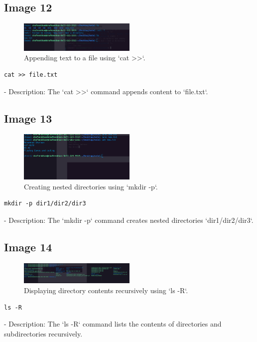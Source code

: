 \documentclass[12pt]{article}
\begin{document}
\subsection*{Image 12}
\begin{figure}[h!]
    \centering
    \includegraphics[width=0.5\textwidth]{12.png}
    \caption{Appending text to a file using `cat >>`.}
\end{figure}
\begin{lstlisting}
cat >> file.txt
\end{lstlisting}
- Description: The `cat >>` command appends content to `file.txt`.

\subsection*{Image 13}
\begin{figure}[h!]
    \centering
    \includegraphics[width=0.5\textwidth]{13.png}
    \caption{Creating nested directories using `mkdir -p`.}
\end{figure}
\begin{lstlisting}
mkdir -p dir1/dir2/dir3
\end{lstlisting}
- Description: The `mkdir -p` command creates nested directories `dir1/dir2/dir3`.

\subsection*{Image 14}
\begin{figure}[h!]
    \centering
    \includegraphics[width=0.5\textwidth]{14.png}
    \caption{Displaying directory contents recursively using `ls -R`.}
\end{figure}
\begin{lstlisting}
ls -R
\end{lstlisting}
- Description: The `ls -R` command lists the contents of directories and subdirectories recursively.
\end{document}
